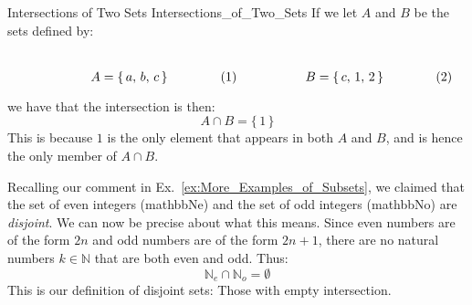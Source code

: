         \begin{fexample}{Intersections of Two Sets}
                        {Intersections_of_Two_Sets}
            If we let $A$ and $B$ be the sets defined by:
            \par
            \begin{subequations}
                \begin{minipage}[b]{0.49\textwidth}
                    \centering
                    \begin{equation}
                        A=\{\,a,\,b,\,c\,\}
                    \end{equation}
                \end{minipage}
                \hfill
                \begin{minipage}[b]{0.49\textwidth}
                    \centering
                    \begin{equation}
                        B=\{\,c,\,1,\,2\,\}
                    \end{equation}
                \end{minipage}
            \end{subequations}
            \par\vspace{2.5ex}
            we have that the intersection is then:
            \begin{equation}
                A\cap{B}=\{\,1\,\}
            \end{equation}
            This is because $1$ is the only element that appears in both $A$ and
            $B$, and is hence the only member of $A\cap{B}$.
        \end{fexample}
        \begin{example}
            Recalling our comment in Ex.~\ref{ex:More_Examples_of_Subsets},
            we claimed that the set of even integers (\gls{mathbbNe}) and the
            set of odd integers (\gls{mathbbNo}) are
            \textit{disjoint}. We can now be precise
            about what this means. Since even numbers are of the form $2n$ and
            odd numbers are of the form $2n+1$, there are no natural numbers
            $k\in\mathbb{N}$ that are both even and odd. Thus:
            \begin{equation}
                \mathbb{N}_{e}\cap\mathbb{N}_{o}=\emptyset
            \end{equation}
            This is our definition of disjoint sets: Those with empty
            intersection.
        \end{example}
